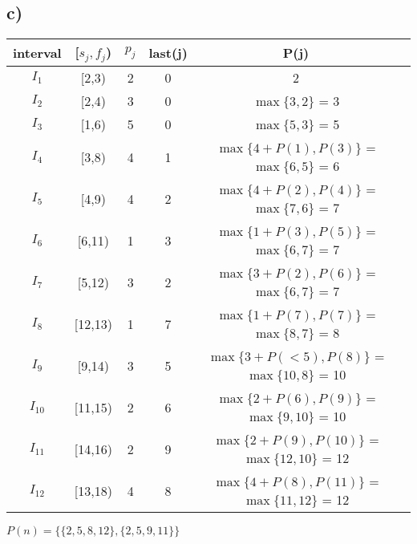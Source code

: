 \documentclass[12pt]{article}
\begin{document}
\subsection*{c)}
\begin{center}
\begin{tabular}{c c c c c c}
    interval & [$s_j,f_j$) & $p_j$ & last(j) & P(j)\\
    \hline
    $I_1$ & [2,3) & 2 & 0 & 2\\
    $I_2$ & [2,4) & 3 & 0 & $\max \{ 3, 2\}$ = 3\\
    $I_3$ & [1,6) & 5 & 0 & $\max \{ 5, 3\}$ = 5\\
    $I_4$ & [3,8) & 4 & 1 & $\max \{ 4 + P(1), P(3)\}$ = $\max \{ 6, 5\}$ = 6\\
    $I_5$ & [4,9) & 4 & 2 & $\max \{ 4 + P(2), P(4)\}$ = $\max \{ 7, 6\}$ = 7\\
    $I_6$ & [6,11) & 1 & 3 & $\max \{ 1 + P(3), P(5)\}$ = $\max \{ 6, 7\}$ = 7\\
    $I_7$ & [5,12) & 3 & 2 & $\max \{ 3 + P(2), P(6)\}$ = $\max \{ 6, 7\}$ = 7\\
    $I_8$ & [12,13) & 1 & 7 & $\max \{ 1 + P(7), P(7)\}$ = $\max \{ 8, 7\}$ = 8\\
    $I_9$ & [9,14) & 3 & 5 & $\max \{ 3 + P(<5), P(8)\}$ = $\max \{ 10, 8\}$ = 10\\
    $I_{10}$ & [11,15) & 2 & 6 & $\max \{ 2 + P(6), P(9)\}$ = $\max \{ 9, 10\}$ = 10\\
    $I_{11}$ & [14,16) & 2 & 9 &  $\max \{ 2 + P(9), P(10)\}$ = $\max \{ 12, 10\}$ = 12\\
    $I_{12}$ & [13,18) & 4 & 8 & $\max \{ 4 + P(8), P(11)\}$ = $\max \{11 , 12\}$ = 12\\
\end{tabular}
\end{center}
$P(n) = \bigg\{\{2, 5, 8, 12\}, \{2, 5, 9, 11\}\bigg\}$
\end{document}
